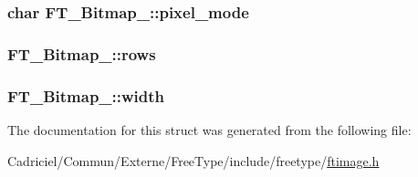 \hypertarget{struct_f_t___bitmap___a5cc5e0fe42a93a86e16706ad52e087a2}{
\subsubsection[{pixel\-\_\-mode}]{\setlength{\rightskip}{0pt plus 5cm}char F\-T\-\_\-\-Bitmap\-\_\-\-::pixel\-\_\-mode}}\label{struct_f_t___bitmap___a5cc5e0fe42a93a86e16706ad52e087a2}
\hypertarget{struct_f_t___bitmap___a1b6bb20b30fe087e3fc87a0eb37730c0}{
\subsubsection[{rows}]{ F\-T\-\_\-\-Bitmap\-\_\-\-::rows}}\label{struct_f_t___bitmap___a1b6bb20b30fe087e3fc87a0eb37730c0}
\hypertarget{struct_f_t___bitmap___a7b5e6252dd91a3809fe80ebbeb6720eb}{
\subsubsection[{width}]{ F\-T\-\_\-\-Bitmap\-\_\-\-::width}}\label{struct_f_t___bitmap___a7b5e6252dd91a3809fe80ebbeb6720eb}


The documentation for this struct was generated from the following file\-:\begin{DoxyCompactItemize}
\item 
Cadriciel/\-Commun/\-Externe/\-Free\-Type/include/freetype/\hyperlink{ftimage_8h}{ftimage.\-h}\end{DoxyCompactItemize}
